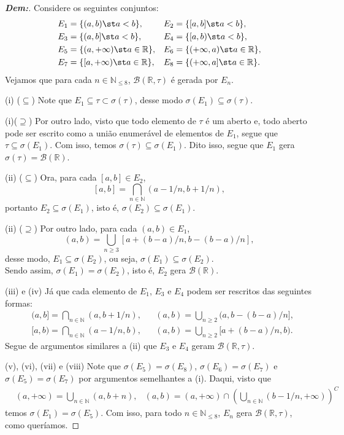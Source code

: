 \begin{proof}[\textbf{Dem:}]
Considere os seguintes conjuntos:
\begin{align*}
  &E_1 = \{(a, b) \st  a<b\}, &&E_2= \{[a, b]\st  a< b\},\\
  &E_3 = \{(a, b] \st  a<b\}, &&E_4= \{[a, b)\st  a< b\},\\
  &E_5 = \{(a, +\infty) \st  a\in\mathbb R\}, &&E_6= \{(+\infty, a)\st  a \in \mathbb R\}, \\
  &E_7 = \{[a, +\infty) \st  a\in\mathbb R\}, &&E_8= \{(+\infty, a]\st  a \in \mathbb R\}.
\end{align*}
Vejamos que para cada $n \in \mathbb N_{\leq 8}$, $\mathcal B(\mathbb R, \tau)$
é gerada por $E_n$.

(i) ($\subseteq$) Note que $E_1 \subseteq \tau \subset \sigma(\tau)$, 
desse modo $\sigma(E_1) \subseteq \sigma(\tau)$. 

(i)($\supseteq$) Por outro lado, visto que todo elemento de $\tau$ é um aberto
e, todo aberto pode ser escrito como a união enumerável de elementos de $E_1$, 
segue que $\tau \subseteq \sigma(E_1)$. Com isso, temos $\sigma(\tau) \subseteq \sigma(E_1)$.
Dito isso, segue que $E_1$ gera $\sigma(\tau)=\mathcal B (\mathbb R)$. 

(ii) ($\subseteq$) Ora, para cada $[a, b] \in E_2$, 
$$[a, b] = \bigcap\limits_{n \in \mathbb N} (a - 1/n, b + 1/n),$$
portanto $E_2 \subseteq \sigma(E_1)$, isto é, $\sigma(E_2) \subseteq \sigma(E_1)$. 

(ii) ($\supseteq$) Por outro lado, para cada $(a, b) \in E_1$,
$$(a, b) = \bigcup\limits_{n \ge 3} [a + (b-a)/n, b - (b-a)/n],$$
desse modo, $E_1 \subseteq \sigma(E_2)$, ou seja, $\sigma(E_1) \subseteq \sigma(E_2)$.\\
Sendo assim, $\sigma(E_1) = \sigma(E_2)$, isto é, $E_2$ gera $\mathcal B(\mathbb R)$.

(iii) e (iv) Já que cada elemento de $E_1$, $E_3$ e $E_4$ 
podem ser rescritos das seguintes formas: 
\begin{align*}
  &(a, b] = \bigcap\limits_{n \in \mathbb N} (a, b+1/n), 
  &&(a, b) = \bigcup\limits_{n \ge 2} (a, b-(b-a)/n],\\
  &[a, b) = \bigcap\limits_{n \in \mathbb N} (a-1/n, b), 
  &&(a, b) = \bigcup\limits_{n \ge 2} [a+(b-a)/n, b).
\end{align*}
Segue de argumentos similares a (ii) que $E_3$ e $E_4$ geram $\mathcal B(\mathbb R, \tau)$.

  (v), (vi), (vii) e (viii) Note que $\sigma(E_5) = \sigma(E_8)$, $\sigma(E_6) = \sigma(E_7)$ e 
  $\sigma(E_5) = \sigma(E_7)$ por argumentos semelhantes a (i). Daqui, visto que 
\begin{align*}
  &(a, +\infty) = \bigcup\limits_{n \in \mathbb N} (a, b+n), 
  &(a, b) = (a, +\infty) \cap \left(\bigcup\limits_{n \in \mathbb N} (b-1/n, +\infty) \right)^C
\end{align*}
  temos $\sigma(E_1) = \sigma(E_5)$. Com isso, para todo $n \in \mathbb N_{\le 8}$, $E_n$ gera 
  $\mathcal B(\mathbb R, \tau)$, como queríamos.
\end{proof}
\biglinend

